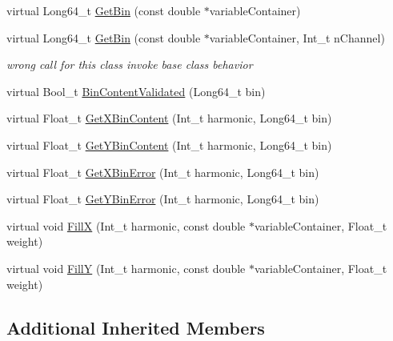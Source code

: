 \begin{DoxyCompactItemize}
virtual Long64\+\_\+t \mbox{\hyperlink{classQn_1_1CorrectionProfileComponents_a379eff8f5c5b741e41fb70354a665ae2}{Get\+Bin}} (const double $\ast$variable\+Container)
\item 
\mbox{\label{classQn_1_1CorrectionProfileComponents_ad3899de482c6f1f6a32d317b76e87a8a}} 
virtual Long64\+\_\+t \mbox{\hyperlink{classQn_1_1CorrectionProfileComponents_ad3899de482c6f1f6a32d317b76e87a8a}{Get\+Bin}} (const double $\ast$variable\+Container, Int\+\_\+t n\+Channel)
\begin{DoxyCompactList}\small\item\em wrong call for this class invoke base class behavior \end{DoxyCompactList}\item 
virtual Bool\+\_\+t \mbox{\hyperlink{classQn_1_1CorrectionProfileComponents_a0fd41214d81f38e1a468fba4441e762c}{Bin\+Content\+Validated}} (Long64\+\_\+t bin)
\item 
virtual Float\+\_\+t \mbox{\hyperlink{classQn_1_1CorrectionProfileComponents_a9641c29b1ceebb6c7a2e9137b27439f3}{Get\+X\+Bin\+Content}} (Int\+\_\+t harmonic, Long64\+\_\+t bin)
\item 
virtual Float\+\_\+t \mbox{\hyperlink{classQn_1_1CorrectionProfileComponents_aba7aebf07e0a7add371da1d53101b64a}{Get\+Y\+Bin\+Content}} (Int\+\_\+t harmonic, Long64\+\_\+t bin)
\item 
virtual Float\+\_\+t \mbox{\hyperlink{classQn_1_1CorrectionProfileComponents_ae531786bf5f3e39e7b0eb8b02ed2405f}{Get\+X\+Bin\+Error}} (Int\+\_\+t harmonic, Long64\+\_\+t bin)
\item 
virtual Float\+\_\+t \mbox{\hyperlink{classQn_1_1CorrectionProfileComponents_a13d0f6f98ec1bf3fc5a3934c09d48ba9}{Get\+Y\+Bin\+Error}} (Int\+\_\+t harmonic, Long64\+\_\+t bin)
\item 
virtual void \mbox{\hyperlink{classQn_1_1CorrectionProfileComponents_ac95e667193644fda86a55c79e6d8fb35}{FillX}} (Int\+\_\+t harmonic, const double $\ast$variable\+Container, Float\+\_\+t weight)
\item 
virtual void \mbox{\hyperlink{classQn_1_1CorrectionProfileComponents_ad434d2b7e8297ec4350ebe37f398bfd3}{FillY}} (Int\+\_\+t harmonic, const double $\ast$variable\+Container, Float\+\_\+t weight)
\end{DoxyCompactItemize}
\subsection*{Additional Inherited Members}



